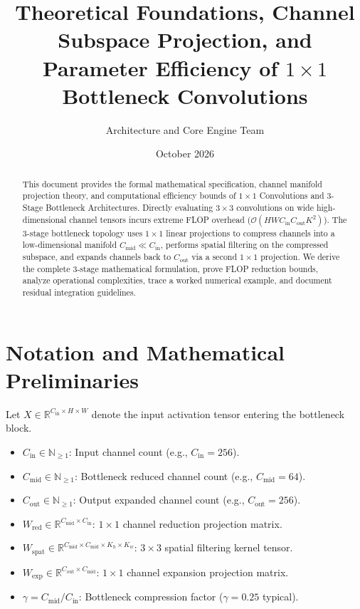 \documentclass[11pt,a4paper]{article}
\title{\textbf{Theoretical Foundations, Channel Subspace Projection, and Parameter Efficiency of $1 \times 1$ Bottleneck Convolutions}}
\author{Architecture and Core Engine Team}
\date{October 2026}
\theoremstyle{definition}
\begin{document}
\maketitle

\begin{abstract}
This document provides the formal mathematical specification, channel manifold projection theory, and computational efficiency bounds of $1 \times 1$ Convolutions and 3-Stage Bottleneck Architectures. Directly evaluating $3 \times 3$ convolutions on wide high-dimensional channel tensors incurs extreme FLOP overhead ($\mathcal{O}(H W C_{\text{in}} C_{\text{out}} K^2)$). The 3-stage bottleneck topology uses $1 \times 1$ linear projections to compress channels into a low-dimensional manifold $C_{\text{mid}} \ll C_{\text{in}}$, performs spatial filtering on the compressed subspace, and expands channels back to $C_{\text{out}}$ via a second $1 \times 1$ projection. We derive the complete 3-stage mathematical formulation, prove FLOP reduction bounds, analyze operational complexities, trace a worked numerical example, and document residual integration guidelines.
\end{abstract}

\section{Notation and Mathematical Preliminaries}

Let $X \in \mathbb{R}^{C_{\text{in}} \times H \times W}$ denote the input activation tensor entering the bottleneck block.

\begin{itemize}
    \item $C_{\text{in}} \in \mathbb{N}_{\ge 1}$: Input channel count (e.g., $C_{\text{in}} = 256$).
    \item $C_{\text{mid}} \in \mathbb{N}_{\ge 1}$: Bottleneck reduced channel count (e.g., $C_{\text{mid}} = 64$).
    \item $C_{\text{out}} \in \mathbb{N}_{\ge 1}$: Output expanded channel count (e.g., $C_{\text{out}} = 256$).
    \item $W_{\text{red}} \in \mathbb{R}^{C_{\text{mid}} \times C_{\text{in}}}$: $1 \times 1$ channel reduction projection matrix.
    \item $W_{\text{spat}} \in \mathbb{R}^{C_{\text{mid}} \times C_{\text{mid}} \times K_h \times K_w}$: $3 \times 3$ spatial filtering kernel tensor.
    \item $W_{\text{exp}} \in \mathbb{R}^{C_{\text{out}} \times C_{\text{mid}}}$: $1 \times 1$ channel expansion projection matrix.
    \item $\gamma = C_{\text{mid}} / C_{\text{in}}$: Bottleneck compression factor ($\gamma = 0.25$ typical).
\end{itemize}
\end{document}
